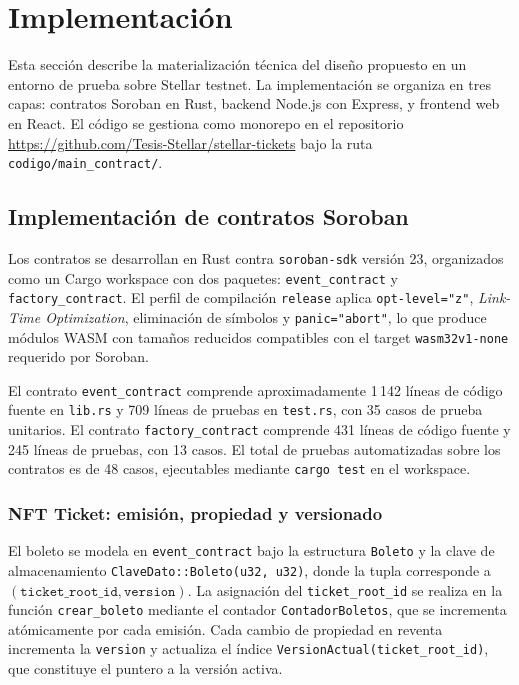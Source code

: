 \newpage
\section{Implementación}

Esta sección describe la materialización técnica del diseño propuesto en un entorno de prueba sobre Stellar testnet. La implementación se organiza en tres capas: contratos Soroban en Rust, backend Node.js con Express, y frontend web en React. El código se gestiona como monorepo en el repositorio \url{https://github.com/Tesis-Stellar/stellar-tickets} bajo la ruta \texttt{codigo/main\_contract/}.

\subsection{Implementación de contratos Soroban}

Los contratos se desarrollan en Rust contra \texttt{soroban-sdk} versión 23, organizados como un Cargo workspace con dos paquetes: \texttt{event\_contract} y \texttt{factory\_contract}. El perfil de compilación \texttt{release} aplica \texttt{opt-level="z"}, \textit{Link-Time Optimization}, eliminación de símbolos y \texttt{panic="abort"}, lo que produce módulos WASM con tamaños reducidos compatibles con el target \texttt{wasm32v1-none} requerido por Soroban.

El contrato \texttt{event\_contract} comprende aproximadamente 1\,142 líneas de código fuente en \texttt{lib.rs} y 709 líneas de pruebas en \texttt{test.rs}, con 35 casos de prueba unitarios. El contrato \texttt{factory\_contract} comprende 431 líneas de código fuente y 245 líneas de pruebas, con 13 casos. El total de pruebas automatizadas sobre los contratos es de 48 casos, ejecutables mediante \texttt{cargo test} en el workspace.

\subsubsection{NFT Ticket: emisión, propiedad y versionado}

El boleto se modela en \texttt{event\_contract} bajo la estructura \texttt{Boleto} y la clave de almacenamiento \texttt{ClaveDato::Boleto(u32, u32)}, donde la tupla corresponde a \((\texttt{ticket\_root\_id}, \texttt{version})\). La asignación del \texttt{ticket\_root\_id} se realiza en la función \texttt{crear\_boleto} mediante el contador \texttt{ContadorBoletos}, que se incrementa atómicamente por cada emisión. Cada cambio de propiedad en reventa incrementa la \texttt{version} y actualiza el índice \texttt{VersionActual(ticket\_root\_id)}, que constituye el puntero a la versión activa.

